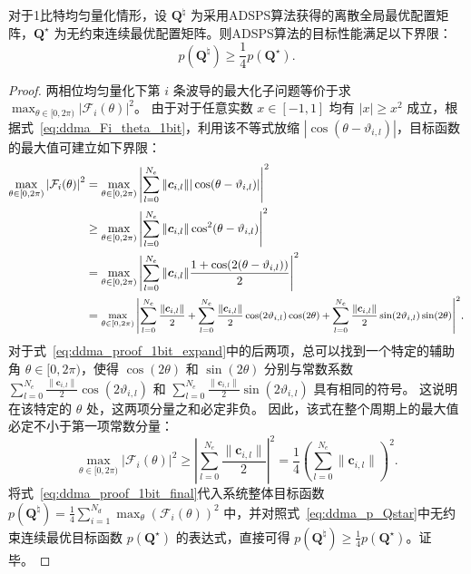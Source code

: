 \begin{proposition}\label{pro:ddma_adsps_1bit_bound}
	对于1比特均匀量化情形，设 $\bm Q^{\natural}$ 为采用ADSPS算法获得的离散全局最优配置矩阵，$\bm Q^{\star}$ 为无约束连续最优配置矩阵。则ADSPS算法的目标性能满足以下界限：
	\begin{equation}
		p(\bm Q^{\natural}) \ge \frac{1}{4} p(\bm Q^{\star}).
	\end{equation}
\end{proposition}

\begin{proof}
	两相位均匀量化下第 $i$ 条波导的最大化子问题等价于求 $\max_{\theta \in [0, 2\pi)} |\mathcal F_i(\theta)|^2$。
	由于对于任意实数 $x \in [-1, 1]$ 均有 $|x| \ge x^2$ 成立，根据式~\eqref{eq:ddma_Fi_theta_1bit}，利用该不等式放缩 $|\cos(\theta - \vartheta_{i,l})|$，目标函数的最大值可建立如下界限：
	\begin{align}
		\max_{\theta \in [0, 2\pi)} \left| \mathcal F_i(\theta) \right|^2 
		&= \max_{\theta \in [0, 2\pi)} \left| \sum_{l=0}^{N_e} \|\bm c_{i,l}\| |\cos(\theta - \vartheta_{i,l})| \right|^2 \nonumber \\
		&\ge \max_{\theta \in [0, 2\pi)} \left| \sum_{l=0}^{N_e} \|\bm c_{i,l}\| \cos^2(\theta - \vartheta_{i,l}) \right|^2 \nonumber \\
		&= \max_{\theta \in [0, 2\pi)} \left| \sum_{l=0}^{N_e} \|\bm c_{i,l}\| \frac{1 + \cos(2(\theta - \vartheta_{i,l}))}{2} \right|^2 \nonumber \\
		&= \medmath{\max_{\theta \in [0, 2\pi)} \left| \sum_{l=0}^{N_e} \frac{\|\bm c_{i,l}\|}{2} + \sum_{l=0}^{N_e} \frac{\|\bm c_{i,l}\|}{2} \cos(2\vartheta_{i,l})\cos(2\theta) + \sum_{l=0}^{N_e} \frac{\|\bm c_{i,l}\|}{2} \sin(2\vartheta_{i,l})\sin(2\theta) \right|^2}. \label{eq:ddma_proof_1bit_expand}
	\end{align}
	对于式~\eqref{eq:ddma_proof_1bit_expand}中的后两项，总可以找到一个特定的辅助角 $\theta \in [0, 2\pi)$，使得 $\cos(2\theta)$ 和 $\sin(2\theta)$ 分别与常数系数 $\sum_{l=0}^{N_e} \frac{\|\bm c_{i,l}\|}{2} \cos(2\vartheta_{i,l})$ 和 $\sum_{l=0}^{N_e} \frac{\|\bm c_{i,l}\|}{2} \sin(2\vartheta_{i,l})$ 具有相同的符号。
	这说明在该特定的 $\theta$ 处，这两项分量之和必定非负。
	因此，该式在整个周期上的最大值必定不小于第一项常数分量：
	\begin{equation}\label{eq:ddma_proof_1bit_final}
		\max_{\theta \in [0, 2\pi)} \left| \mathcal F_i(\theta) \right|^2 \ge \left| \sum_{l=0}^{N_e} \frac{\|\bm c_{i,l}\|}{2} \right|^2 = \frac{1}{4} \left( \sum_{l=0}^{N_e} \|\bm c_{i,l}\| \right)^2.
	\end{equation}
	将式~\eqref{eq:ddma_proof_1bit_final}代入系统整体目标函数 $p(\bm Q^{\natural}) = \frac{1}{4} \sum_{i=1}^{N_d} \max_\theta (\mathcal F_i(\theta))^2$ 中，并对照式~\eqref{eq:ddma_p_Qstar}中无约束连续最优目标函数 $p(\bm Q^{\star})$ 的表达式，直接可得 $p(\bm Q^{\natural}) \ge \frac{1}{4} p(\bm Q^{\star})$。证毕。
\end{proof}

